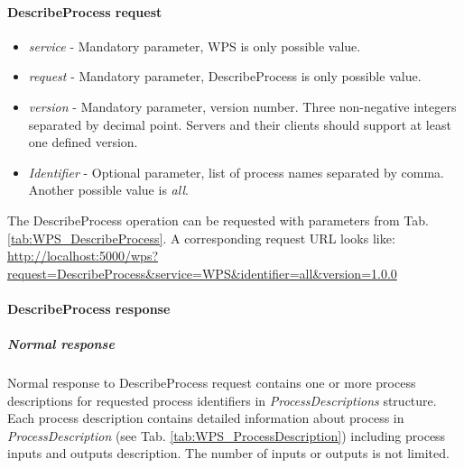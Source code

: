 \paragraph{DescribeProcess request}
\begin{itemize}
\item\textit{service} - Mandatory parameter, WPS is only possible value.
\item\textit{request} - Mandatory parameter, DescribeProcess is only possible value.
\item\textit{version} - Mandatory parameter, version number. Three non-negative integers separated by decimal point. Servers and
their clients should support at least one defined version.
\item\textit{Identifier} - Optional parameter, list of process names separated by comma. Another possible value is \textit{all}.
\end{itemize}

The DescribeProcess operation can be requested with parameters from Tab. \ref{tab:WPS_DescribeProcess}. A corresponding
request URL looks like: \url{http://localhost:5000/wps?request=DescribeProcess&service=WPS&identifier=all&version=1.0.0}

\paragraph{DescribeProcess response}
\label{para:DesribeProc_response}

\subparagraph{Normal response}
Normal response to DescribeProcess request contains one or more process descriptions for requested process identifiers in
\textit{ProcessDescriptions} structure. Each
process description contains detailed information about process in \textit{ProcessDescription} (see Tab. \ref{tab:WPS_ProcessDescription})
including process inputs and outputs description. The number of inputs or outputs is not limited.

